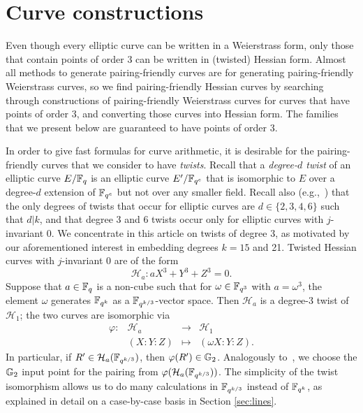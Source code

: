 \section{Curve constructions}
\label{sec:curves}

Even though every elliptic curve can be written in a Weierstrass form,
only those that contain points of order 3 can be written in (twisted) Hessian form.
Almost all methods to generate pairing-friendly curves are for generating
pairing-friendly Weierstrass curves, 
so we find pairing-friendly Hessian curves by
searching through constructions of pairing-friendly Weierstrass curves for curves that have points of order 3,
and converting those curves into Hessian form.
The families that we present below are guaranteed to have points of order 3.

In order to give fast formulas for curve arithmetic, it is desirable for the pairing-friendly curves that we consider to have \emph{twists}.
Recall that a \emph{degree-$d$ twist} of an elliptic curve $E/\mathbb{F}_{q}$ is an elliptic curve $E'/\mathbb{F}_{q^e}$ that is
isomorphic to $E$ over a degree-$d$ extension of $\mathbb{F}_{q^e}$ but not over any smaller field.
Recall also (e.g.,~\cite{2009/silverman-arithmetic}) that the only degrees of twists that occur for elliptic curves are $d \in \{2,3,4,6\}$ such that $d|k$, and that degree 3 and 6 twists occur only for elliptic curves with $j$-invariant 0.
We concentrate in this article on twists of degree 3, as motivated by our aforementioned interest in embedding degrees $k = 15$ and 21.
Twisted Hessian curves with $j$-invariant 0 are of the form
\[\mathcal{H}_a: aX^3 + Y^3 + Z^3 = 0.\]
Suppose that $a \in \mathbb{F}_{q}$ is a non-cube such that
for $\omega \in \mathbb{F}_{q^3}$ with $a = \omega^3$, the element
$\omega$ generates $\mathbb{F}_{q^k}$ as a $\mathbb{F}_{q^{k/3}}$-vector space.
Then $\mathcal{H}_{a}$ is a degree-3 twist of $\mathcal{H}_1$; the two curves are isomorphic via
\begin{equation}\label{twistiso}
\begin{array}{rccc}
\varphi: & \mathcal{H}_{a} & \rightarrow & \mathcal{H}_1 \\
& (X:Y:Z) & \mapsto & (\omega X:Y:Z).
\end{array}
\end{equation}
In particular, if $R' \in \mathcal{H}_{a}(\mathbb{F}_{q^{k/3}})$, then
$\varphi(R') \in \mathbb{G}_{2}$.
Analogously to~\cite{2003/bls}, we choose the $\mathbb{G}_{2}$ input point for the pairing
from $\varphi(\mathcal{H}_{a}(\mathbb{F}_{q^{k/3}}))$.
The simplicity of the twist isomorphism 
allows us to do many calculations in $\mathbb{F}_{q^{k/3}}$ instead of $\mathbb{F}_{q^k}$,
as explained in detail on a case-by-case basis in Section \ref{sec:lines}.

